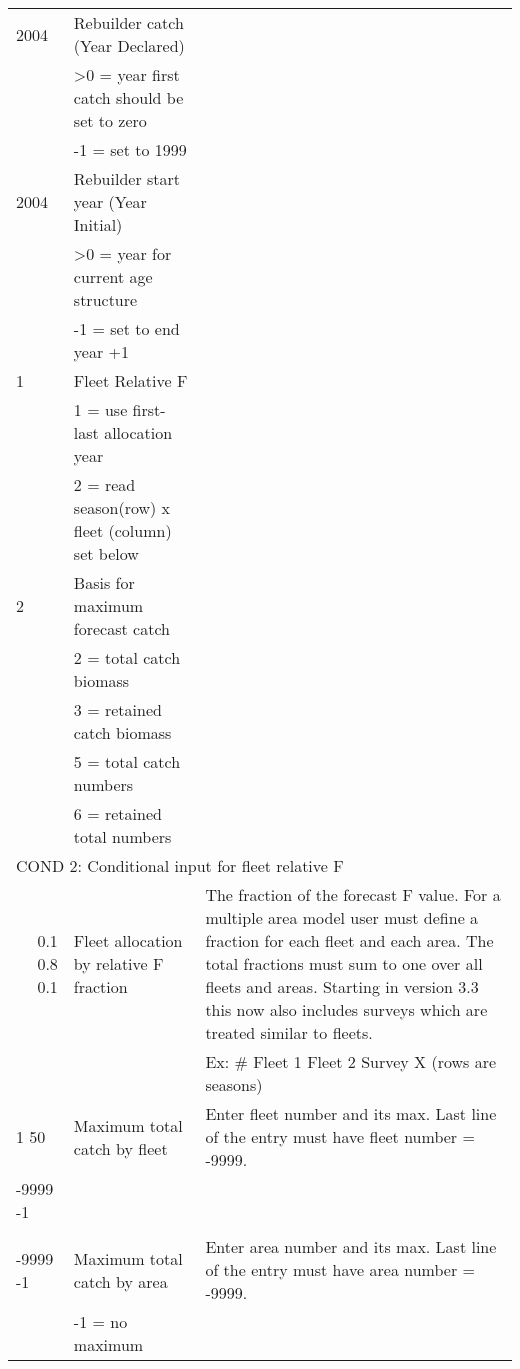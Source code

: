 \begin{landscape}
\begin{longtable}{p{3cm} p{7cm} p{11cm}}
 \hline
 2004 & Rebuilder catch (Year Declared) & \\
      & >0 = year first catch should be set to zero & \\
      & -1 = set to 1999 & \\
      
 \hline
 2004 & Rebuilder start year (Year Initial) & \\
      & >0 = year for current age structure & \\
      & -1 = set to end year +1 & \\
 \hline
 1 & Fleet Relative F & \\
   & 1 = use first-last allocation year & \\
   & 2 = read season(row) x fleet (column) set below & \\
 \hline 
 2 & Basis for maximum forecast catch &  \\
   & 2 = total catch biomass & \\
   & 3 = retained catch biomass & \\
   & 5 = total catch numbers & \\
   & 6 = retained total numbers & \\
  \hline  
 \multicolumn{3}{l}{COND 2: Conditional input for fleet relative F} \\
 \multicolumn{1}{r}{0.1 0.8 0.1}  & Fleet allocation by relative F fraction & The fraction of the forecast F value.  For a multiple area model user must define a fraction for each fleet and each area.  The total fractions must sum to one over all fleets and areas.  Starting in version 3.3 this now also includes surveys which are treated similar to fleets.\\
   &  &  Ex: \# Fleet 1  Fleet 2  Survey X (rows are seasons)\\ 
 
  \hline
  1 50 & Maximum total catch by fleet & \multirow{1}{1cm}[-0.1cm]{\parbox{11cm}{Enter fleet number and its max. Last line of the entry must have fleet number = -9999.}} \\
  -9999 -1 & & \\
	   & & \\
  
  \hline
  -9999 -1 & Maximum total catch by area & \multirow{1}{1cm}[-0.1cm]{\parbox{11cm}{Enter area number and its max. Last line of the entry must have area number = -9999.}} \\
     & -1 = no maximum & \\
     

\end{longtable}
\end{landscape}
